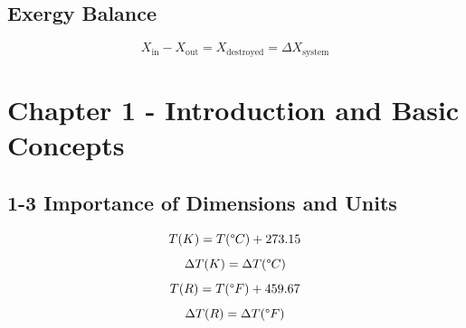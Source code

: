 \documentclass[10pt,landscape]{article}
\begin{document}
\begin{multicols}{3}
\subsection{Exergy Balance}
\begin{equation}
    X_\text{in}-X_\text{out}=X_\text{destroyed}=\Delta X_\text{system}
\end{equation}

\section{Chapter 1 - Introduction and Basic Concepts}
\subsection{1-3 Importance of Dimensions and Units}
\begin{equation}
    T(K)=T(\degree C)+273.15
\end{equation}
\begin{equation}
    \Delta T(K)=\Delta T(\degree C)
\end{equation}
\begin{equation}
    T(R)=T(\degree F)+459.67
\end{equation}
\begin{equation}
    \Delta T(R)=\Delta T(\degree F)
\end{equation}

\end{multicols}
\end{document}
